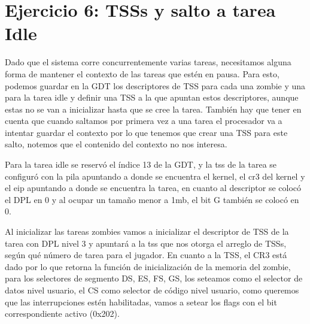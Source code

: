 \section{Ejercicio 6: TSSs y salto a tarea Idle}
Dado que el sistema corre concurrentemente varias tareas, necesitamos alguna forma de mantener el contexto de las tareas que estén en pausa. Para esto, podemos guardar en la GDT los descriptores de TSS para cada una zombie y una para la tarea idle y definir una TSS a la que apuntan estos descriptores, aunque estas no se van a inicializar hasta que se cree la tarea. También hay que tener en cuenta que cuando saltamos por primera vez a una tarea el procesador va a intentar guardar el contexto por lo que tenemos que crear una TSS para este salto, notemos que el contenido del contexto no nos interesa.

Para la tarea idle se reservó el índice 13 de la GDT, y la tss de la tarea se configuró con la pila apuntando a donde se encuentra el kernel, el cr3 del kernel y el eip apuntando a donde se encuentra la tarea, en cuanto al descriptor se colocó el DPL en 0 y al ocupar un tamaño menor a 1mb, el bit G también se colocó en 0.

Al inicializar las tareas zombies vamos a inicializar el descriptor de TSS de la tarea con DPL nivel 3 y apuntará a la tss que nos otorga el arreglo de TSSs, según qué número de tarea para el jugador. En cuanto a la TSS, el CR3 está dado por lo que retorna la función de inicialización de la memoria del zombie, para los selectores de segmento DS, ES, FS, GS, los seteamos como el selector de datos nivel usuario, el CS como selector de código nivel usuario, como queremos que las interrupciones estén habilitadas, vamos a setear los flags con el bit correspondiente activo (0x202).
